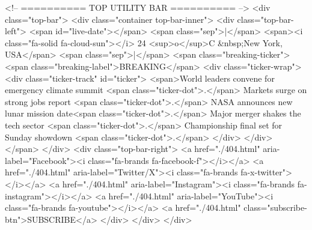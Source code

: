     <!-- ========== TOP UTILITY BAR ========== -->
    <div class="top-bar">
        <div class="container top-bar-inner">
            <div class="top-bar-left">
                <span id="live-date"></span>
                <span class="sep">|</span>
                <span><i class="fa-solid fa-cloud-sun"></i> 24 <sup>o</sup>C &nbsp;New York, USA</span>
                <span class="sep">|</span>
                <span class="breaking-ticker">
                    <span class="breaking-label">BREAKING</span>
                    <div class="ticker-wrap">
                        <div class="ticker-track" id="ticker">
                            <span>World leaders convene for emergency climate summit <span class="ticker-dot">.</span>
                                Markets surge on strong jobs report <span class="ticker-dot">.</span> NASA announces new
                                lunar mission date<span class="ticker-dot">.</span> Major merger shakes the tech sector
                                <span class="ticker-dot">.</span> Championship final set for Sunday showdown <span
                                    class="ticker-dot">.</span>
                        </div>
                    </div>
                </span>
            </div>
            <div class="top-bar-right">
                <a href="./404.html" aria-label="Facebook"><i class="fa-brands fa-facebook-f"></i></a>
                <a href="./404.html" aria-label="Twitter/X"><i class="fa-brands fa-x-twitter"></i></a>
                <a href="./404.html" aria-label="Instagram"><i class="fa-brands fa-instagram"></i></a>
                <a href="./404.html" aria-label="YouTube"><i class="fa-brands fa-youtube"></i></a>
                <a href="./404.html" class="subscribe-btn">SUBSCRIBE</a>
            </div>
        </div>
    </div>

